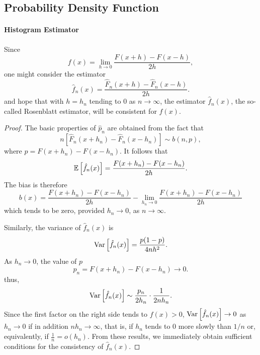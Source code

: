 \subsection{Probability Density Function}

\paragraph{Histogram Estimator}
Since
\begin{equation*}
	f(x)=\lim_{h\rightarrow0}\frac{F(x+h)-F(x-h)}{2h},
\end{equation*}
one might consider the estimator
\begin{equation*}
	\hat{f}_{n}(x)=\frac{\hat{F}_{n}(x+h)-\hat{F}_{n}(x-h)}{2h}.
\end{equation*}
and hope that with $h=h_{n}$ tending to 0 as $n\rightarrow\infty$, the estimator $\hat{f}_{n}(x)$, the so-called Rosenblatt estimator, will be consistent for $f(x)$.

\begin{proof}
	The basic properties of $\hat{p}_{n}$ are obtained from the fact that
	\begin{equation*}
		n\left[\hat{F}_{n}(x+h_{n})-\hat{F}_{n}(x-h_{n})\right]\sim b(n,p),
	\end{equation*}
	where $p=F(x+h_{n})-F(x-h_{n})$. It follows that
	\begin{equation*}
		{\mathbb E}\left[\hat{f}_{n}(x)\right]=\frac{F(x+h_{n})-F(x-h_{n})}{2h}.
	\end{equation*}
	The bias is therefore
	\begin{equation*}
		b(x)=\frac{F(x+h_{n})-F(x-h_{n})}{2h}-\lim_{h_{n}\rightarrow0}\frac{F(x+h_{n})-F(x-h_{n})}{2h}
	\end{equation*}
	which tends to be zero, provided $h_{n}\rightarrow0$, as $n\rightarrow\infty$.

	Similarly, the variance of $\hat{f}_{n}(x)$ is
	\begin{equation*}
		\mathrm{Var}\left[\hat{f}_{n}(x)\right]=\frac{p(1-p)}{4nh^{2}}.
	\end{equation*}
	As $h_{n} \rightarrow 0$, the value of $p$
	\begin{equation*}
		p_{n}=F\left(x+h_{n}\right)-F\left(x-h_{n}\right) \rightarrow 0.
	\end{equation*}
	thus,
	\begin{equation*}
		\mathrm{Var}\left[\hat{f}_{n}(x)\right]\sim\frac{p_{n}}{2h_{n}}\cdot\frac{1}{2nh_{n}}.
	\end{equation*}
	Since the first factor on the right side tends to $f(x)>0$, $\mathrm{Var}\left[\hat{f}_{n}(x)\right] \rightarrow 0$ as $h_{n}\rightarrow 0$ if in addition $nh_{n}\rightarrow\infty$, that is, if $h_{n}$ tends to 0 more slowly than $1/n$ or, equivalently, if $\frac{1}{n}=o\left(h_{n}\right)$.
	From these results, we immediately obtain sufficient conditions for the consistency of $\hat{f}_{n}(x)$.
\end{proof}


